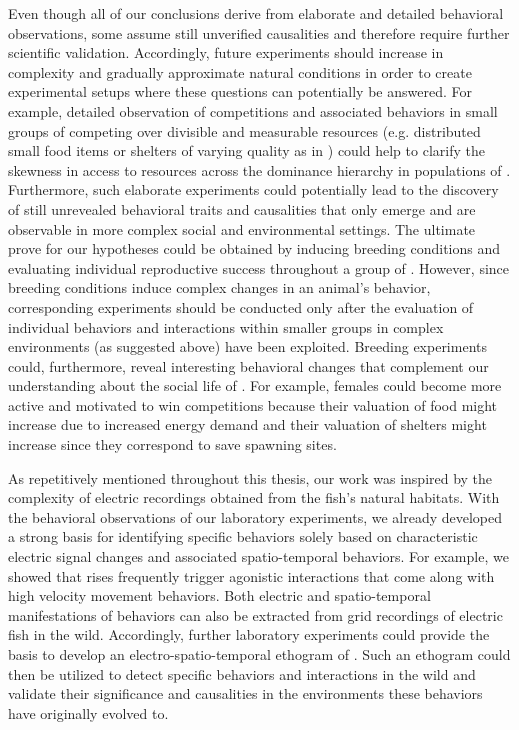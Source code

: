 Even though all of our conclusions derive from elaborate and detailed behavioral observations, some assume still unverified causalities and therefore require further scientific validation. Accordingly, future experiments should increase in complexity and gradually approximate natural conditions in order to create experimental setups where these questions can potentially be answered. For example, detailed observation of competitions and associated behaviors in small groups of \lepto{} competing over divisible and measurable resources (e.g. distributed small food items or shelters of varying quality as in \citealp{Dunlap2002}) could help to clarify the skewness in access to resources across the dominance hierarchy in populations of \lepto{}. Furthermore, such elaborate experiments could potentially lead to the discovery of still unrevealed behavioral traits and causalities that only emerge and are observable in more complex social and environmental settings. The ultimate prove for our hypotheses could be obtained by inducing breeding conditions and evaluating individual reproductive success throughout a group of \lepto{}. However, since breeding conditions induce complex changes in an animal's behavior, corresponding experiments should be conducted only after the evaluation of individual behaviors and interactions within smaller groups in complex environments (as suggested above) have been exploited. Breeding experiments could, furthermore, reveal interesting behavioral changes that complement our understanding about the social life of \lepto{}. For example, females could become more active and motivated to win competitions because their valuation of food might increase due to increased energy demand and their valuation of shelters might increase since they correspond to save spawning sites.

As repetitively mentioned throughout this thesis, our work was inspired by the complexity of electric recordings obtained from the fish's natural habitats. With the behavioral observations of our laboratory experiments, we already developed a strong basis for identifying specific behaviors solely based on characteristic electric signal changes and associated spatio-temporal behaviors. For example, we showed that rises frequently trigger agonistic interactions that come along with high velocity movement behaviors. Both electric and spatio-temporal manifestations of behaviors can also be extracted from grid recordings of electric fish in the wild. Accordingly, further laboratory experiments could provide the basis to develop an electro-spatio-temporal ethogram of \lepto{}. Such an ethogram could then be utilized to detect specific behaviors and interactions in the wild and validate their significance and causalities in the environments these behaviors have originally evolved to.  

%
%